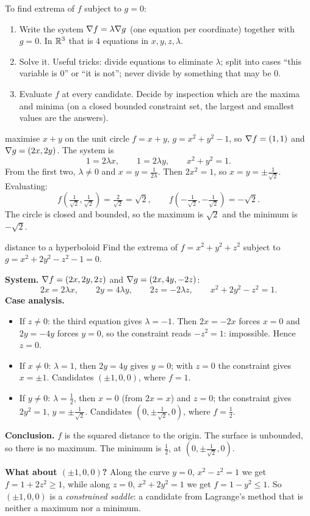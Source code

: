 \begin{recipe}
To find extrema of $f$ subject to $g=0$:
\begin{enumerate}
  \item Write the system $\nabla f=\lambda\nabla g$ (one equation per coordinate) together with
  $g=0$. In $\mathbb{R}^3$ that is $4$ equations in $x,y,z,\lambda$.
  \item Solve it. Useful tricks: divide equations to eliminate $\lambda$; split into cases
  ``this variable is $0$'' or ``it is not''; never divide by something that may be $0$.
  \item Evaluate $f$ at every candidate. Decide by inspection which are the maxima and minima
  (on a closed bounded constraint set, the largest and smallest values are the answers).
\end{enumerate}
\end{recipe}

\begin{example}{maximise $x+y$ on the unit circle}
$f=x+y$, $g=x^2+y^2-1$, so $\nabla f=(1,1)$ and $\nabla g=(2x,2y)$. The system is
\[ 1=2\lambda x,\qquad 1=2\lambda y,\qquad x^2+y^2=1 . \]
From the first two, $\lambda\neq0$ and $x=y=\frac{1}{2\lambda}$. Then $2x^2=1$, so
$x=y=\pm\frac1{\sqrt2}$. Evaluating:
\[ f\left(\tfrac1{\sqrt2},\tfrac1{\sqrt2}\right)=\tfrac2{\sqrt2}=\sqrt2,\qquad f\left(-\tfrac1{\sqrt2},-\tfrac1{\sqrt2}\right)=-\sqrt2 . \]
The circle is closed and bounded, so the maximum is $\sqrt2$ and the minimum is $-\sqrt2$.
\end{example}

\begin{example}{distance to a hyperboloid}
Find the extrema of $f=x^2+y^2+z^2$ subject to $g=x^2+2y^2-z^2-1=0$.

\textbf{System.} $\nabla f=(2x,2y,2z)$ and $\nabla g=(2x,4y,-2z)$:
\[ 2x=2\lambda x,\qquad 2y=4\lambda y,\qquad 2z=-2\lambda z,\qquad x^2+2y^2-z^2=1 . \]
\textbf{Case analysis.}
\begin{itemize}
  \item If $z\neq0$: the third equation gives $\lambda=-1$. Then $2x=-2x$ forces $x=0$ and
  $2y=-4y$ forces $y=0$, so the constraint reads $-z^2=1$: impossible. Hence $z=0$.
  \item If $x\neq0$: $\lambda=1$, then $2y=4y$ gives $y=0$; with $z=0$ the constraint gives
  $x=\pm1$. Candidates $(\pm1,0,0)$, where $f=1$.
  \item If $y\neq0$: $\lambda=\tfrac12$, then $x=0$ (from $2x=x$) and $z=0$; the constraint gives
  $2y^2=1$, $y=\pm\frac1{\sqrt2}$. Candidates $(0,\pm\frac1{\sqrt2},0)$, where $f=\tfrac12$.
\end{itemize}
\textbf{Conclusion.} $f$ is the squared distance to the origin. The surface is unbounded, so
there is no maximum. The minimum is $\tfrac12$, at $(0,\pm\frac1{\sqrt2},0)$.

\textbf{What about $(\pm1,0,0)$?} Along the curve $y=0$, $x^2-z^2=1$ we get $f=1+2z^2\ge1$, while
along $z=0$, $x^2+2y^2=1$ we get $f=1-y^2\le1$. So $(\pm1,0,0)$ is a \emph{constrained saddle}:
a candidate from Lagrange's method that is neither a maximum nor a minimum.
\end{example}

